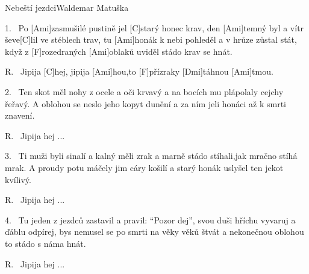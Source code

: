 \begin{song}{Nebeští jezdci}{Waldemar Matuška}

\begin{xverse}{1.~}
Po [Ami]zasmušilé pustině jel [C]starý honec krav,
den [Ami]temný byl a vítr ševe[C]lil ve stéblech trav,
tu [Ami]honák k nebi pohleděl a v hrůze zůstal stát,
když z [F]rozedraných [Ami]oblaků uviděl stádo krav se hnát.
\end{xverse}

\begin{xverse}{R.~}
Jipija [C]hej, jipija [Ami]hou,to [F]přízraky [Dmi]táhnou [Ami]tmou.
\end{xverse}

\begin{xverse}{2.~}
Ten skot měl nohy z ocele a oči krvavý
a na bocích mu plápolaly cejchy řeřavý.
A oblohou se neslo jeho kopyt dunění
a za ním jeli honáci až k smrti znavení.
\end{xverse}

\begin{xverse}{R.~}
Jipija hej ...
\end{xverse}


\begin{xverse}{3.~}
Ti muži byli sinalí a kalný měli zrak
a marně stádo stíhali,jak mračno stíhá mrak.
A proudy potu máčely jim cáry košilí
a starý honák uslyšel ten jekot kvílivý.
\end{xverse}

\begin{xverse}{R.~}
Jipija hej ...
\end{xverse}

\begin{xverse}{4.~}
Tu jeden z jezdců zastavil a pravil: ``Pozor dej'',
svou duši hříchu vyvaruj a ďáblu odpírej,
bys nemusel se po smrti na věky věků štvát
a nekonečnou oblohou to stádo s náma hnát.
\end{xverse}

\begin{xverse}{R.~}
Jipija hej ...
\end{xverse}

\end{song}


